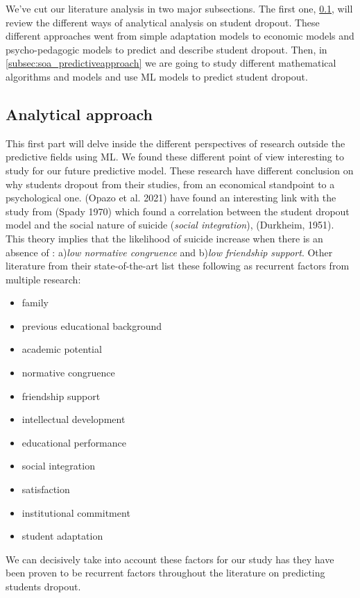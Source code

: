 \documentclass[conference]{IEEEtran}
\begin{document}
We've cut our literature analysis in two major subsections. The first one, \ref{subsec:soa_analyticalapproeach}, will review the different ways of analytical analysis on student dropout. These different approaches went from simple adaptation models to economic models and psycho-pedagogic models to predict and describe student dropout. Then, in \ref{subsec:soa_predictiveapproach} we are going to study different mathematical algorithms and models and use ML models to predict student dropout.

\subsection{Analytical approach}
\label{subsec:soa_analyticalapproeach}
This first part will delve inside the different perspectives of research outside the predictive fields using ML. We found these different point of view interesting to study for our future predictive model. These research have different conclusion on why students dropout from their studies, from an economical standpoint to a psychological one.
(Opazo et al. 2021)\cite{opazo_analysis_2021} have found an interesting link with the study from (Spady 1970) which found a correlation between the student dropout model and the social nature of suicide (\textit{social integration}), (Durkheim, 1951). This theory implies that the likelihood of suicide increase when there is an absence of : a)\textit{low normative congruence} and b)\textit{low friendship support}. Other literature from their state-of-the-art list these following as recurrent factors from multiple research\cite{opazo_analysis_2021}\cite{spady_dropouts_1970,tinto_dropout_1975,caspersen_teachers_2015,lidia_problema_2006,bejarano_caso_2017,sinchi_acceso_2018,cavero_voluntad_2011,velasco_alisis_nodate}: 
\begin{itemize}
\item family
\item previous educational background
\item academic potential
\item normative congruence
\item friendship support
\item intellectual development
\item educational performance
\item social integration
\item satisfaction
\item institutional commitment
\item student adaptation
\end{itemize}
We can decisively take into account these factors for our study has they have been proven to be recurrent factors throughout the literature on predicting students dropout.
\end{document}
